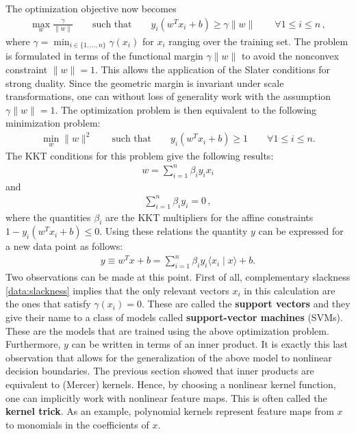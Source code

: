     The optimization objective now becomes
    \begin{gather}
        \max_w\frac{\gamma}{\|w\|} \qquad\text{such that}\qquad  y_i(w^Tx_i+b)\geq\gamma\|w\|\qquad\forall 1\leq i\leq n\,,
    \end{gather}
    where $\gamma=\min_{i\in\{1,\ldots,n\}}\gamma(x_i)$ for $x_i$ ranging over the training set. The problem is formulated in terms of the functional margin $\gamma\|w\|$ to avoid the nonconvex constraint $\|w\|=1$. This allows the application of the Slater conditions for strong duality. Since the geometric margin is invariant under scale transformations, one can without loss of generality work with the assumption $\gamma\|w\|=1$. The optimization problem is then equivalent to the following minimization problem:
    \begin{gather}
        \min_w\|w\|^2 \qquad\text{such that}\qquad y_i(w^Tx_i+b)\geq1\qquad\forall 1\leq i\leq n.
    \end{gather}
    The KKT conditions for this problem give the following results:
    \begin{gather}
        w = \sum_{i=1}^n\beta_iy_ix_i
    \end{gather}
    and
    \begin{gather}
        \sum_{i=1}^n\beta_iy_i = 0\,,
    \end{gather}
    where the quantities $\beta_i$ are the KKT multipliers for the affine constraints $1-y_i(w^Tx_i+b)\leq0$. Using these relations the quantity $y$ can be expressed for a new data point as follows:
    \begin{gather}
        y \equiv w^Tx + b = \sum_{i=1}^n\beta_iy_i\langle x_i\mid x \rangle + b.
    \end{gather}
    Two observations can be made at this point. First of all, complementary slackness \ref{data:slackness} implies that the only relevant vectors $x_i$ in this calculation are the ones that satisfy $\gamma(x_i)=0$. These are called the \textbf{support vectors} and they give their name to a class of models called \textbf{support-vector machines} (SVMs). These are the models that are trained using the above optimization problem. Furthermore, $y$ can be written in terms of an inner product. It is exactly this last observation that allows for the generalization of the above model to nonlinear decision boundaries. The previous section showed that inner products are equivalent to (Mercer) kernels. Hence, by choosing a nonlinear kernel function, one can implicitly work with nonlinear feature maps. This is often called the \textbf{kernel trick}. As an example, polynomial kernels represent feature maps from $x$ to monomials in the coefficients of $x$.


